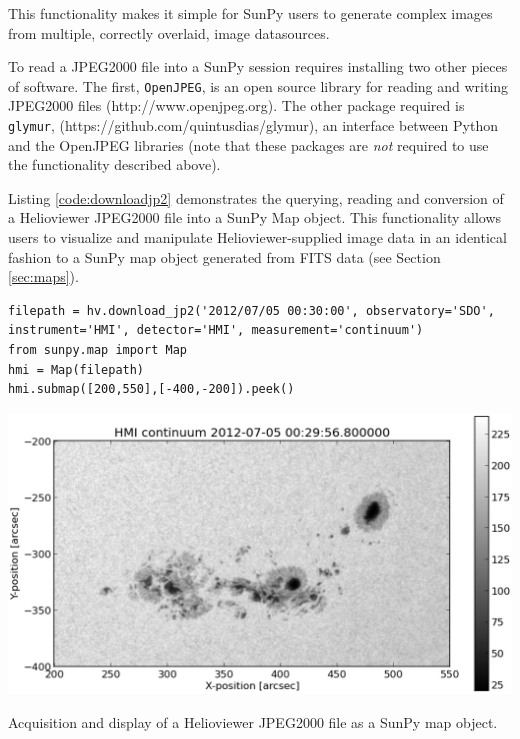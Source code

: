 This functionality makes it simple for SunPy users to generate complex
images from multiple, correctly overlaid, image datasources. 



To read a JPEG2000 file into a SunPy session requires installing two
other pieces of software. The first, \texttt{OpenJPEG}, is an open
source library for reading and writing JPEG2000 files
(http://www.openjpeg.org).  The other package required is
\texttt{glymur}, (https://github.com/quintusdias/glymur), an interface
between Python and the OpenJPEG libraries (note that these packages
are {\it not} required to use the functionality described above).


Listing \ref{code:downloadjp2} demonstrates the querying, reading and
conversion of a Helioviewer JPEG2000 file into a SunPy Map object.
This functionality allows users to visualize and manipulate
Helioviewer-supplied image data in an identical fashion to a SunPy map
object generated from FITS data (see Section \ref{sec:maps}).

\begin{listing}
\begin{verbatim}
filepath = hv.download_jp2('2012/07/05 00:30:00', observatory='SDO', instrument='HMI', detector='HMI', measurement='continuum')
from sunpy.map import Map
hmi = Map(filepath)
hmi.submap([200,550],[-400,-200]).peek()
\end{verbatim}
\includegraphics[width=0.8\columnwidth]{helioviewer_hmi_continuum_jp2_to_map.eps}
\caption{Acquisition and display of a Helioviewer JPEG2000 file as a
  SunPy map object.}
\label{code:downloadjp2}
\end{listing}


